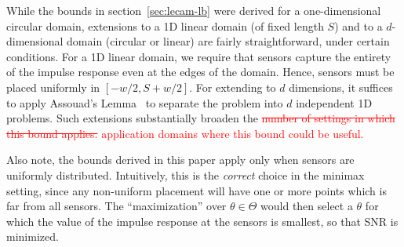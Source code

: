 \documentclass[conference,letterpaper]{IEEEtran}
\DeclarePairedDelimiter\abs{\lvert}{\rvert}
\begin{document}
While the bounds in section~\ref{sec:lecam-lb} were derived for a
one-dimensional circular domain, extensions to a 1D linear domain (of fixed
length $S$) and to a $d$-dimensional domain (circular or linear) are fairly
straightforward, under certain conditions. For a 1D linear domain, we require
that sensors capture the entirety of the impulse response even at the edges of
the domain. Hence, sensors must be placed uniformly in $[-w/2, S{+}w/2]$. For
extending to $d$ dimensions, it suffices to apply Assouad's
Lemma~\cite[Sec.~2.7.2]{Tsybakov2009Introduction} to separate the problem into
$d$ independent 1D problems. Such extensions substantially broaden the
\textcolor{red}{\sout{number of settings in which this bound applies.}
	application domains where this bound could be useful.}

Also note, the bounds derived in this paper apply only when sensors are
uniformly distributed.  Intuitively, this is the \emph{correct} choice in the
minimax setting, since any non-uniform placement will have one or more points
which is far from all sensors. The ``maximization'' over $\theta \in \Theta$
would then select a $\theta$ for which the value of the impulse response at the
sensors is smallest, so that SNR is minimized.



\end{document}
